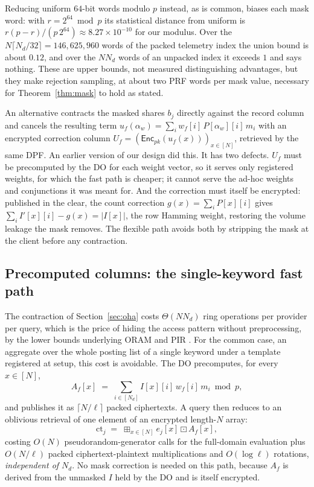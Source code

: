 \documentclass[a4paper,fleqn]{cas-sc}
\newif\ifauthorchecks
\newcommand{\authorcheck}[1]{\ifauthorchecks{\color{red}\textsf{[Authors: #1]}}\fi}
\newcommand{\Enc}{\mathsf{Enc}}
\newcommand{\bplus}{\boxplus}
\newcommand{\bdot}{\boxdot}
\begin{document}
Reducing uniform $64$-bit words modulo $p$ instead, as is common, biases each
mask word: with $r=2^{64}\bmod p$ its statistical distance from uniform is
$r(p-r)/(p\,2^{64})\approx8.27\times10^{-10}$ for our modulus. Over the
$N\lceil N_d/32\rceil=146{,}625{,}960$ words of the packed telemetry index the
union bound is about $0.12$, and over the $NN_d$ words of an unpacked index it
exceeds $1$ and says nothing. These are upper bounds, not measured
distinguishing advantages, but they make rejection sampling, at about two PRF
words per mask value, necessary for Theorem~\ref{thm:mask} to hold as stated.
\authorcheck{The C++ prototype still reduces 64-bit words over an unpacked
index, so Theorem~\ref{thm:mask} does not cover the index its leakage
experiment used; port the rejection sampler of crshe/prg.py and re-run
Section~\ref{sec:leakeval}.}

\begin{remark}
\label{rem:whyenc}
An alternative contracts the masked shares $b_j$ directly against the record
column and cancels the resulting term
$u_f(\alpha_w)=\sum_i w_f[i]\,P[\alpha_w][i]\,m_i$ with an encrypted correction
column $U_f=(\Enc_{pk}(u_f(x)))_{x\in[N]}$, retrieved by the same DPF. An
earlier version of our design did this. It has two defects. $U_f$ must be precomputed by
the DO for each weight vector, so it serves only registered weights, for which
the fast path is cheaper; it cannot serve the ad-hoc weights and conjunctions
it was meant for. And the correction must itself be encrypted: published in the
clear, the count correction $g(x)=\sum_iP[x][i]$ gives
$\sum_iI'[x][i]-g(x)=|I[x]|$, the row Hamming weight, restoring the volume
leakage the mask removes. The flexible path avoids both by stripping the mask
at the client before any contraction.
\end{remark}

\subsection{Precomputed columns: the single-keyword fast path}
\label{sec:fast}
The contraction of Section~\ref{sec:oha} costs $\Theta(N N_d)$ ring operations
per provider per query, which is the price of hiding the access pattern
without preprocessing, by the lower bounds underlying ORAM and PIR
\citep{goldreich1996software,beimel2000reducing}. For the common case, an
aggregate over the whole posting list of a single keyword under a template
registered at setup, this cost is avoidable. The DO precomputes, for every
$x\in[N]$,
\[
A_f[x] \;=\; \sum_{i\in[N_d]} I[x][i]\,w_f[i]\,m_i \bmod p ,
\]
and publishes it as $\lceil N/\ell\rceil$ packed ciphertexts. A query then
reduces to an oblivious retrieval of one element of an encrypted length-$N$
array:
\[
\text{ct}_j \;=\; \bplus_{x\in[N]} e_j[x]\bdot A_f[x],
\]
costing $O(N)$ pseudorandom-generator calls for the full-domain evaluation
plus $O(N/\ell)$ packed ciphertext-plaintext multiplications and
$O(\log \ell)$ rotations, \emph{independent of $N_d$}. No mask correction is
needed on this path, because $A_f$ is derived from the unmasked $I$ held by
the DO and is itself encrypted.
\end{document}
